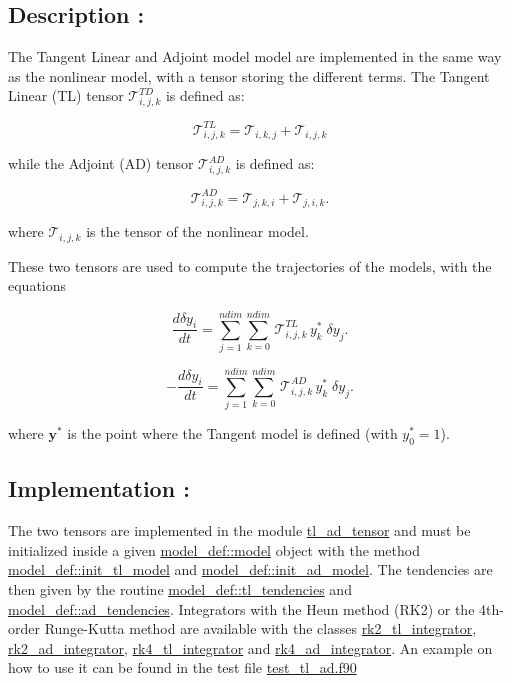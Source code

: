 \subsection*{Description \+:}

The Tangent Linear and Adjoint model model are implemented in the same way as the nonlinear model, with a tensor storing the different terms. The Tangent Linear (TL) tensor $\mathcal{T}_{i,j,k}^{TD}$ is defined as\+:

\[ \mathcal{T}_{i,j,k}^{TL} = \mathcal{T}_{i,k,j} + \mathcal{T}_{i,j,k} \]

while the Adjoint (AD) tensor $\mathcal{T}_{i,j,k}^{AD}$ is defined as\+:

\[ \mathcal{T}_{i,j,k}^{AD} = \mathcal{T}_{j,k,i} + \mathcal{T}_{j,i,k} . \]

where $ \mathcal{T}_{i,j,k}$ is the tensor of the nonlinear model.

These two tensors are used to compute the trajectories of the models, with the equations

\[ \frac{d\delta y_i}{dt} = \sum_{j=1}^{ndim}\sum_{k=0}^{ndim} \, \mathcal{T}_{i,j,k}^{TL} \, y^{\ast}_k \; \delta y_j . \]

\[ -\frac{d\delta y_i}{dt} = \sum_{j=1}^{ndim} \sum_{k=0}^{ndim} \, \mathcal{T}_{i,j,k}^{AD} \, y^{\ast}_k \; \delta y_j . \]

where $\boldsymbol{y}^{\ast}$ is the point where the Tangent model is defined (with $y_0^{\ast}=1$).

\subsection*{Implementation \+:}

The two tensors are implemented in the module \hyperlink{namespacetl__ad__tensor}{tl\+\_\+ad\+\_\+tensor} and must be initialized inside a given \hyperlink{structmodel__def_1_1model}{model\+\_\+def\+::model} object with the method \hyperlink{namespacemodel__def_a70a2babf6e9897311a4177e864cc5a9e}{model\+\_\+def\+::init\+\_\+tl\+\_\+model} and \hyperlink{namespacemodel__def_a0eb49b66f98539511b388dabbf00586c}{model\+\_\+def\+::init\+\_\+ad\+\_\+model}. The tendencies are then given by the routine \hyperlink{namespacemodel__def_a77f89a429fafffdb6341feda8ff43274}{model\+\_\+def\+::tl\+\_\+tendencies} and \hyperlink{namespacemodel__def_a1622350bace311440f39acb8dc647059}{model\+\_\+def\+::ad\+\_\+tendencies}. Integrators with the Heun method (R\+K2) or the 4th-\/order Runge-\/\+Kutta method are available with the classes \hyperlink{namespacerk2__tl__integrator}{rk2\+\_\+tl\+\_\+integrator}, \hyperlink{namespacerk2__ad__integrator}{rk2\+\_\+ad\+\_\+integrator}, \hyperlink{namespacerk4__tl__integrator}{rk4\+\_\+tl\+\_\+integrator} and \hyperlink{namespacerk4__ad__integrator}{rk4\+\_\+ad\+\_\+integrator}. An example on how to use it can be found in the test file \hyperlink{test__tl__ad_8f90_source}{test\+\_\+tl\+\_\+ad.\+f90} 